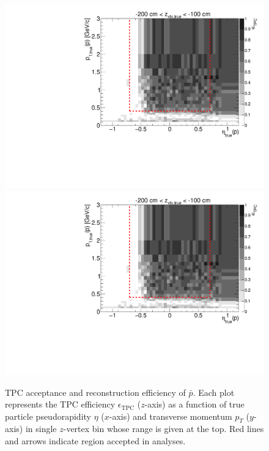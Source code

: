 \begin{figure}[hb]
\caption[TPC acceptance and reconstruction efficiency of $\bar{p}$.]{TPC acceptance and reconstruction efficiency of $\bar{p}$. Each plot represents the TPC efficiency $\epsilon_{\text{TPC}}$ ($z$-axis) as a function of true particle pseudorapidity $\eta$ ($x$-axis) and transverse momentum $p_{T}$ ($y$-axis) in single $z$-vertex bin whose range is given at the top. Red lines and arrows indicate region accepted in analyses.}\label{fig:eff_proton_minus}
\centering
\parbox{0.495\textwidth}{
  \centering
  \includegraphics[width=\linewidth,page=3]{graphics/eff/Eff2D_TPC_proton_Minus.pdf}\\
  \includegraphics[width=\linewidth,page=5]{graphics/eff/Eff2D_TPC_proton_Minus.pdf}\\
}
\end{figure}
